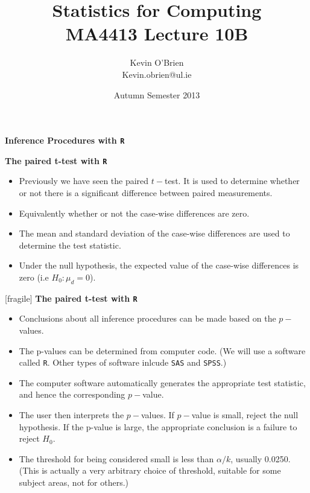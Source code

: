 \documentclass[a4]{beamer}
\title[MA4413]{Statistics for Computing \\ {\normalsize MA4413 Lecture 10B}}
\author[Kevin O'Brien]{Kevin O'Brien \\ {\scriptsize Kevin.obrien@ul.ie}}
\date{Autumn Semester 2013}
\institute[Maths \& Stats]{Dept. of Mathematics \& Statistics, \\ University \textit{of} Limerick}
\begin{document}
\titlepage



\noindent \textbf{Inference Procedures with \texttt{R}}



\noindent \textbf{The paired t-test with \texttt{R}}
\vspace{-1cm}
\begin{itemize}
\item Previously we have seen the paired $t-$test. It is used to determine whether or
not there is a significant difference between paired measurements. \item Equivalently whether or not
the case-wise differences are zero.
\item The mean and standard deviation of the case-wise differences are used to determine the test statistic.
\item Under the null hypothesis, the expected value of the case-wise differences is zero (i.e $H_0 : \mu_d = 0$).
\end{itemize}




[fragile]
\noindent \textbf{The paired t-test with \texttt{R}}
\begin{itemize}
\item Conclusions about all inference procedures can be made based on the $p-$values.
\item The p-values can be determined from computer code. (We will use a software called \texttt{R}. Other types of software inlcude \texttt{SAS} and \texttt{SPSS}.)
\item The computer software automatically generates the appropriate test statistic, and hence the corresponding $p-$value.
\item The user then interprets the $p-$values. If $p-$value is small, reject the null hypothesis. If the p-value is large, the appropriate conclusion is a failure to reject $H_0$.
\item The threshold for being considered small is less than $\alpha/k$, usually 0.0250. \\ (This is actually a very arbitrary choice of threshold, suitable for some subject areas, not for others.)
\end{itemize}
\end{document}
